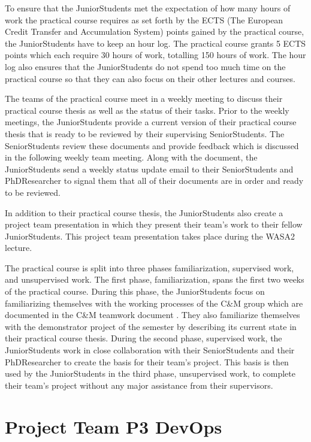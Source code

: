To ensure that the JuniorStudents met the expectation of how many hours of work
the practical course requires as set forth by the ECTS (The European Credit Transfer and Accumulation System)
points gained by the practical course, the JuniorStudents have to keep an hour log.
The practical course grants 5 ECTS points which each require 30 hours of work, totalling 150 hours of work.
The hour log also ensures that the JuniorStudents do not spend too much time on the practical
course so that they can also focus on their other lectures and courses.

The teams of the practical course meet in a weekly meeting to discuss their practical course
thesis as well as the status of their tasks. Prior to the weekly meetings, the JuniorStudents
provide a current version of their practical course thesis that is ready to be reviewed
by their supervising SeniorStudents. The SeniorStudents review these documents and provide
feedback which is discussed in the following weekly team meeting. Along with the document,
the JuniorStudents send a weekly status update email to their SeniorStudents and PhDResearcher
to signal them that all of their documents are in order and ready to be reviewed.

In addition to their practical course thesis, the JuniorStudents also create
a project team presentation in which they present their team's work to their fellow JuniorStudents.
This project team presentation takes place during the WASA2 lecture.

The practical course is split into three phases familiarization, supervised work,
and unsupervised work. The first phase, familiarization, spans the first two weeks of the practical
course. During this phase, the JuniorStudents focus on familiarizing themselves with the working
processes of the C\&M group which are documented in the C\&M teamwork document \cite{CM-W-TEA}.
They also familiarize themselves with the demonstrator project of the semester by describing
its current state in their practical course thesis. During the second phase, supervised work,
the JuniorStudents work in close collaboration with their SeniorStudents and their PhDResearcher
to create the basis for their team's project. This basis is then used
by the JuniorStudents in the third phase, unsupervised work, to complete their team's project
without any major assistance from their supervisors.

\section{Project Team P3 DevOps}

